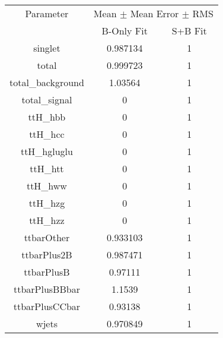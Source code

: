 \begin{table}
\centering

\begin{tabular}{ccc}
\toprule
Parameter & \multicolumn{2}{c}{Mean $\pm$ Mean Error $\pm$ RMS}\\
 & B-Only Fit & S+B Fit\\
\midrule
singlet & \num{0.987134} & \num{1}\\
total & \num{0.999723} & \num{1}\\
total\_background & \num{1.03564} & \num{1}\\
total\_signal & \num{0} & \num{1}\\
ttH\_hbb & \num{0} & \num{1}\\
ttH\_hcc & \num{0} & \num{1}\\
ttH\_hgluglu & \num{0} & \num{1}\\
ttH\_htt & \num{0} & \num{1}\\
ttH\_hww & \num{0} & \num{1}\\
ttH\_hzg & \num{0} & \num{1}\\
ttH\_hzz & \num{0} & \num{1}\\
ttbarOther & \num{0.933103} & \num{1}\\
ttbarPlus2B & \num{0.987471} & \num{1}\\
ttbarPlusB & \num{0.97111} & \num{1}\\
ttbarPlusBBbar & \num{1.1539} & \num{1}\\
ttbarPlusCCbar & \num{0.93138} & \num{1}\\
wjets & \num{0.970849} & \num{1}\\
\bottomrule
\end{tabular}
\end{table}